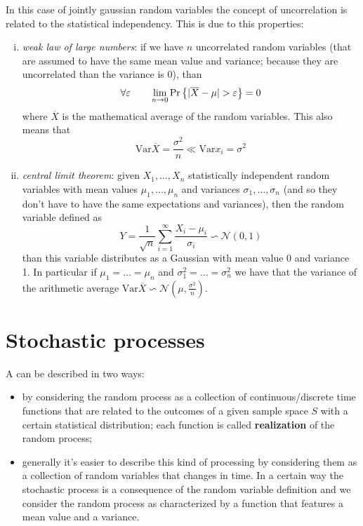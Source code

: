 	In this case of jointly gaussian random variables the concept of uncorrelation is related to the statistical independency. This is due to this properties:
	\begin{enumerate}[i)]
		\item \textit{weak law of large numbers}: if we have $n$ uncorrelated random variables (that are assumed to have the same mean value and variance; because they are uncorrelated than the variance is 0), than 
		\[ \forall \varepsilon \qquad \lim_{n\rightarrow 0} \textrm{Pr}\left\{ |\overline X - \mu| > \varepsilon \right\} = 0 \]
		where $\overline X$ is the mathematical average of the random variables. This also means that
		\[ \textrm{Var}\overline X = \frac{\sigma^2}{n} \ll \textrm{Var}x_i = \sigma^2\]
		
		\item \textit{central limit theorem}: given $X_1,\dots,X_n$ statistically independent random variables with mean values $\mu_1,\dots,\mu_n$ and variances $\sigma_1,\dots, \sigma_n$ (and so they don't have to have the same expectations and variances), then the random variable defined as \[Y = \frac 1 {\sqrt{n}} \sum_{i=1}^\infty  \frac{X_i-\mu_i}{\sigma_i} \backsim \mathcal N(0,1) \] than this variable distributes as a Gaussian with mean value 0 and variance 1. In particular if $\mu_1 = \dots = \mu_n$ and $\sigma_1^2 = \dots = \sigma_n^2$ we have that the variance of the arithmetic average $\textrm{Var}\overline X \backsim \mathcal N \left( \mu, \frac {\sigma^2}n \right)$.
	\end{enumerate}
	
\section{Stochastic processes}
	A  can be described in two ways:
	\begin{itemize}
		\item by considering the random process as a collection of continuous/discrete time functions that are related to the outcomes of a given sample space $S$ with a certain statistical distribution; each function is called \textbf{realization} of the random process;
		
		\item generally it's easier to describe this kind of processing by considering them as a collection of random variables that changes in time. In a certain way the stochastic process is a consequence of the random variable definition and we consider the random process as characterized by a function that features a mean value and a variance.	
		
	\end{itemize}
	
